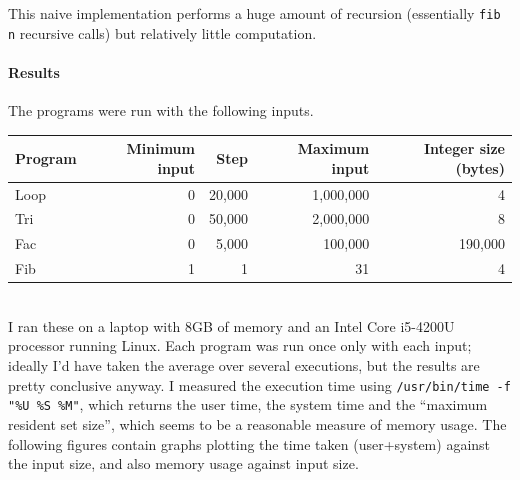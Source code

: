 \documentclass[a4paper]{article}
\begin{document}
\noindent This naive implementation performs a huge amount of
recursion (essentially \texttt{fib n} recursive calls) but relatively
little computation.

\paragraph{Results}

\noindent The programs were run with the following inputs.  
\\

\begin{tabular}{|l|r|r|r|r|} 
\hline
Program   & Minimum input & Step & Maximum input & Integer size (bytes) \\
\hline
Loop & 0 & 20,000 & 1,000,000 & 4\\
Tri  & 0 & 50,000 & 2,000,000 & 8\\
Fac  & 0 & 5,000 & 100,000 & 190,000\\
Fib  & 1 & 1 & 31 & 4 \\
\hline
\end{tabular}
\\

\noindent
I ran these on a laptop with 8GB of memory and an Intel Core i5-4200U
processor running Linux.  Each program was run once only with each
input; ideally I'd have taken the average over several executions, but
the results are pretty conclusive anyway.  I measured the execution
time using \texttt{/usr/bin/time -f "\%U \%S \%M"}, 
which returns the  user time, the system time and the ``maximum resident set size'',
which seems to be a reasonable measure of memory usage.  The
following figures contain graphs plotting the time taken
(user+system) against the input size, and also memory usage
against input size.
\end{document}
